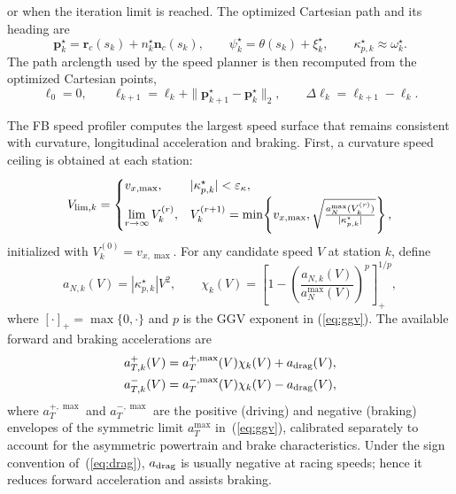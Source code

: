 \documentclass{iopjournal}
\begin{document}
or when the iteration limit is reached.  The optimized Cartesian path and its
heading are
\begin{equation}
\bm p_k^\star=\bm r_c(s_k)+n_k^\star\bm n_c(s_k),\qquad
\psi_k^\star=\theta(s_k)+\xi_k^\star,\qquad
\kappa_{p,k}^\star\approx\omega_k^\star .
\label{eq:path_cart}
\end{equation}
The path arclength used by the speed planner is then recomputed from the
optimized Cartesian points,
\begin{equation}
\ell_0=0,\qquad
\ell_{k+1}=\ell_k+\|\bm p_{k+1}^\star-\bm p_k^\star\|_2,\qquad
\Delta\ell_k=\ell_{k+1}-\ell_k .
\label{eq:path_arclength}
\end{equation}

The FB speed profiler computes the largest speed surface that remains
consistent with curvature, longitudinal acceleration and braking.  First, a
curvature speed ceiling is obtained at each station:
\begin{equation}
V_{{\rm lim},k}=
\begin{cases}
v_{x,\max}, & |\kappa_{p,k}^\star|<\varepsilon_\kappa,\\[2pt]
\displaystyle
\lim_{r\to\infty}V_k^{(r)}, &
V_k^{(r+1)}=
\min\!\left\{
v_{x,\max},
\sqrt{\frac{a_N^{\max}(V_k^{(r)})}{|\kappa_{p,k}^\star|}}
\right\},
\end{cases}
\label{eq:vlim_iter}
\end{equation}
initialized with $V_k^{(0)}=v_{x,\max}$.  For any candidate speed $V$ at
station $k$, define
\begin{equation}
a_{N,k}(V)=|\kappa_{p,k}^\star|V^2,\qquad
\chi_k(V)=
\left[
1-\left(\frac{a_{N,k}(V)}{a_N^{\max}(V)}\right)^p
\right]_+^{1/p},
\label{eq:ggv_factor}
\end{equation}
where $[\cdot]_+=\max\{0,\cdot\}$ and $p$ is the GGV exponent in
(\ref{eq:ggv}).  The available forward and braking accelerations are
\begin{align}
a_{T,k}^{+}(V)
&=a_T^{+,\max}(V)\chi_k(V)+a_{\rm drag}(V),
\label{eq:fb_accel_available}\\
a_{T,k}^{-}(V)
&=a_T^{-,\max}(V)\chi_k(V)-a_{\rm drag}(V),
\label{eq:fb_brake_available}
\end{align}
where $a_T^{+,\max}$ and $a_T^{-,\max}$ are the positive (driving) and
negative (braking) envelopes of the symmetric limit $a_T^{\max}$ in~(\ref{eq:ggv}),
calibrated separately to account for the asymmetric powertrain and brake
characteristics.  Under the sign convention of~(\ref{eq:drag}),
$a_{\rm drag}$ is usually negative at racing speeds; hence it reduces forward
acceleration and assists braking.
\end{document}
